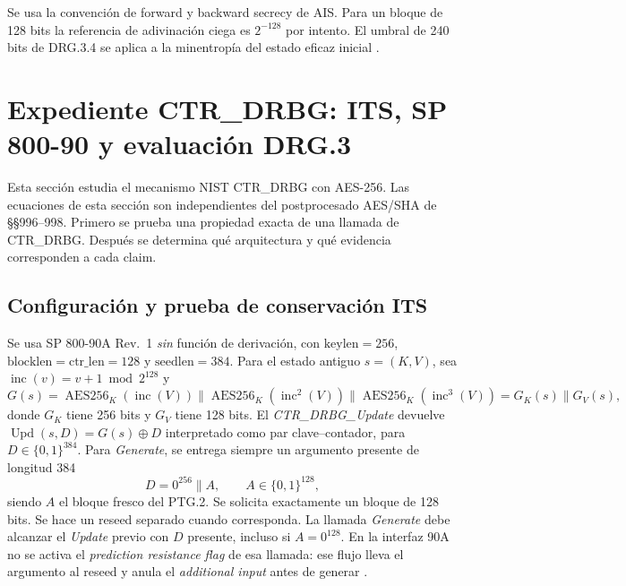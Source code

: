 \documentclass[11pt,a4paper]{article}
\newcommand{\bits}{\{0,1\}}
\newcommand{\AES}{\operatorname{AES256}}
\begin{document}
Se usa la convención de forward y backward secrecy de AIS.
Para un bloque de 128 bits la referencia de adivinación ciega
es $2^{-128}$ por intento. El umbral de 240 bits de DRG.3.4 se aplica
a la minentropía del estado eficaz inicial
\cite[§§121--125, 195, 207, 211--214 y 998]{ais}.


\section{Expediente CTR\_DRBG: ITS, SP 800-90 y evaluación DRG.3}
\label{sec:ctr}
Esta sección estudia el mecanismo NIST CTR\_DRBG con AES-256.
Las ecuaciones de esta sección son independientes del postprocesado
AES/SHA de §§996--998. Primero se prueba una propiedad exacta de una
llamada de CTR\_DRBG. Después se determina qué arquitectura y qué
evidencia corresponden a cada claim.

\subsection{Configuración y prueba de conservación ITS}

Se usa SP 800-90A Rev.~1 \emph{sin} función de derivación, con
\(\mathrm{keylen}=256\), \(\mathrm{blocklen}=\mathrm{ctr\_len}=128\)
y \(\mathrm{seedlen}=384\). Para el estado antiguo \(s=(K,V)\),
sea \(\operatorname{inc}(v)=v+1\bmod 2^{128}\) y
\[
 G(s)=\AES_K(\operatorname{inc}(V))\mathbin\|
       \AES_K(\operatorname{inc}^{2}(V))\mathbin\|
       \AES_K(\operatorname{inc}^{3}(V))
       =G_K(s)\mathbin\|G_V(s),
\]
donde \(G_K\) tiene 256 bits y \(G_V\) tiene 128 bits. El
\emph{CTR\_DRBG\_Update} devuelve
\(\operatorname{Upd}(s,D)=G(s)\oplus D\) interpretado como par
clave--contador, para \(D\in\bits^{384}\). Para \emph{Generate}, se
entrega siempre un argumento presente de longitud 384
\[
                   D=0^{256}\mathbin\|A,\qquad A\in\bits^{128},
\]
siendo \(A\) el bloque fresco del PTG.2. Se solicita exactamente
un bloque de 128 bits. Se hace un reseed separado cuando corresponda.
La llamada \emph{Generate} debe alcanzar el \emph{Update} previo
con \(D\) presente, incluso si \(A=0^{128}\). En la interfaz 90A
no se activa el \emph{prediction resistance flag} de esa llamada:
ese flujo lleva el argumento al reseed y anula el \emph{additional
input} antes de generar
\cite[tabla 3 y §§9.3.3, 10.2.1.2, 10.2.1.5.1]{nist90a}.
\end{document}
